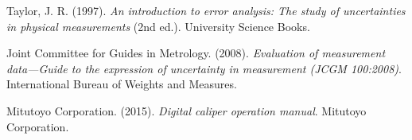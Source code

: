\documentclass[11pt,twocolumn]{article}
\begin{document}
\begin{thebibliography}{9}

 Taylor, J. R. (1997). \textit{An introduction to error analysis: The study of uncertainties in physical measurements} (2nd ed.). University Science Books.

 Joint Committee for Guides in Metrology. (2008). \textit{Evaluation of measurement data—Guide to the expression of uncertainty in measurement (JCGM 100:2008)}. International Bureau of Weights and Measures.

 Mitutoyo Corporation. (2015). \textit{Digital caliper operation manual}. Mitutoyo Corporation.

\end{thebibliography}
\end{document}
